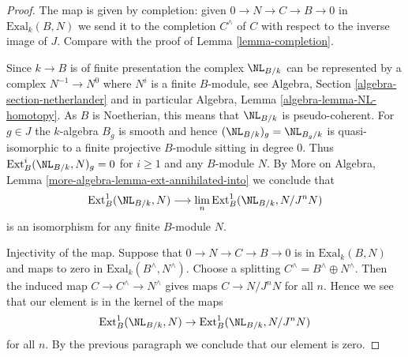 \begin{proof}
The map is given by completion: given $0 \to N \to C \to B \to 0$
in $\text{Exal}_k(B, N)$ we send it to the completion $C^\wedge$
of $C$ with respect to the inverse image of $J$. Compare with
the proof of Lemma \ref{lemma-completion}.

\medskip\noindent
Since $k \to B$ is of finite presentation the complex
$\NL_{B/k}$ can be represented by a complex
$N^{-1} \to N^0$ where $N^i$ is a finite $B$-module, see
Algebra, Section \ref{algebra-section-netherlander} and
in particular
Algebra, Lemma \ref{algebra-lemma-NL-homotopy}.
As $B$ is Noetherian, this means that $\NL_{B/k}$
is pseudo-coherent. For $g \in J$ the $k$-algebra $B_g$
is smooth and hence $(\NL_{B/k})_g = \NL_{B_g/k}$
is quasi-isomorphic to a finite projective $B$-module sitting in degree $0$.
Thus $\text{Ext}^i_B(\NL_{B/k}, N)_g = 0$ for $i \geq 1$
and any $B$-module $N$. By
More on Algebra, Lemma \ref{more-algebra-lemma-ext-annihilated-into}
we conclude that
$$
\text{Ext}^1_B(\NL_{B/k}, N) \longrightarrow
\lim_n \text{Ext}^1_B(\NL_{B/k}, N/J^n N)
$$
is an isomorphism for any finite $B$-module $N$.

\medskip\noindent
Injectivity of the map.
Suppose that $0 \to N \to C \to B \to 0$ is in $\text{Exal}_k(B, N)$
and maps to zero in $\text{Exal}_k(B^\wedge, N^\wedge)$.
Choose a splitting $C^\wedge = B^\wedge \oplus N^\wedge$.
Then the induced map $C \to C^\wedge \to N^\wedge$
gives maps $C \to N/J^nN$ for all $n$.
Hence we see that our element is in the kernel of the maps
$$
\text{Ext}^1_B(\NL_{B/k}, N) \to
\text{Ext}^1_B(\NL_{B/k}, N/J^n N)
$$
for all $n$. By the previous paragraph we conclude that
our element is zero.


\end{proof}
